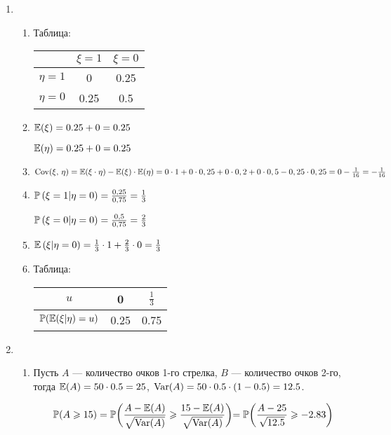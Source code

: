 \begin{enumerate}
\item
\begin{enumerate}
\item Таблица:
	
\begin{center}
\begin{tabular}{ccc}
	& $\xi = 1$ & $\xi = 0$  \\
	\hline
	$\eta = 1$ & 0 & 0.25 \\
	\hline
	$\eta = 0$ & 0.25 & 0.5 \\
	\hline
\end{tabular}
\end{center}
	
\item $\E(\xi) = 0.25 + 0 = 0.25$
	
$\E(\eta) = 0.25 + 0 = 0.25$
	
\item $\Cov(\xi, \, \eta) = \E(\xi\cdot \eta) - \E(\xi)\cdot \E(\eta) = 0 \cdot 1 + 0 \cdot 0,25 + 0 \cdot 0,2 + 0 \cdot 0,5 - 0,25 \cdot 0,25 = 0 - \frac{1}{16} = -\frac{1}{16}$
	
\item $\P\left(\xi = 1 | \eta = 0\right) = \frac{0,25}{0,75} = \frac{1}{3}$
	
$\P\left(\xi = 0 | \eta = 0\right) = \frac{0,5}{0,75} = \frac{2}{3}$
	
\item $\E\left(\xi | \eta = 0 \right) = \frac{1}{3} \cdot 1 + \frac{2}{3} \cdot 0 = \frac{1}{3}$
	
\item Таблица:
	
\begin{center}
\begin{tabular}{ccc}
	$u$ & 0 & $\frac{1}{3}$  \\
	\hline
	$\P(\E(\xi|\eta)=u)$ & 0.25 & 0.75 \\
	\hline
\end{tabular}
\end{center}
\end{enumerate}


\item
\begin{enumerate}
    \item Пусть $A$ — количество очков 1-го стрелка, $B$ — количество очков 2-го, тогда $\E(A) = 50 \cdot 0.5 = 25$, $\Var(A) = 50 \cdot 0.5 \cdot (1 - 0.5) = 12.5$.
        
    \[\P(A \ge 15) = \P\biggl(\frac{A - \E(A)}{\sqrt{\Var(A)}} \ge \frac{15 - \E(A)}{\sqrt{\Var(A)}}\biggl) 
    = \P\biggl(\frac{A - 25}{\sqrt{12.5}} \ge -2.83\biggl)\]
    

\end{enumerate}
\end{enumerate}
